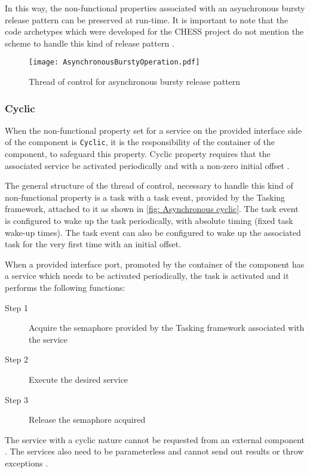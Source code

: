 In this way, the non-functional properties associated with an asynchronous bursty release pattern can be preserved at run-time. It is important to note that the code archetypes which were developed for the CHESS project do not mention the scheme to handle this kind of release pattern \cite{CharEvoRAVCodeAr}\cite{EvoRAVCodeAr}.

\begin{figure}[h]
	\centering
	\texttt{[image: AsynchronousBurstyOperation.pdf]}
	\caption{Thread of control for asynchronous bursty release pattern}
	\label{fig: Asynchronous bursty}
\end{figure}

\subsubsection{\textbf{Cyclic}} 
When the non-functional property set for a service on the provided interface side of the component is \texttt{Cyclic}, it is the responsibility of the container of the component, to safeguard this property. Cyclic property requires that the associated service be activated periodically and with a non-zero initial offset \cite{SpecMetamodel}\cite{CompBasedProcess}. 

The general structure of the thread of control, necessary to handle this kind of non-functional property is a task with a task event, provided by the Tasking framework, attached to it as shown in \cref{fig: Asynchronous cyclic}. The task event is configured to wake up the task periodically, with absolute timing (fixed task wake-up times). The task event can also be configured to wake up the associated task for the very first time with an initial offset.

When a provided interface port, promoted by the container of the component has a service which needs to be activated periodically, the task is activated and it performs the following functions:

\begin{description}
\item [Step 1] Acquire the semaphore provided by the Tasking framework associated with the service
\item [Step 2] Execute the desired service
\item [Step 3] Release the semaphore acquired 
\end{description}    

The service with a cyclic nature cannot be requested from an external component \cite{SpecMetamodel}. The services also need to be parameterless and cannot send out results or throw exceptions \cite{SpecMetamodel}. 

